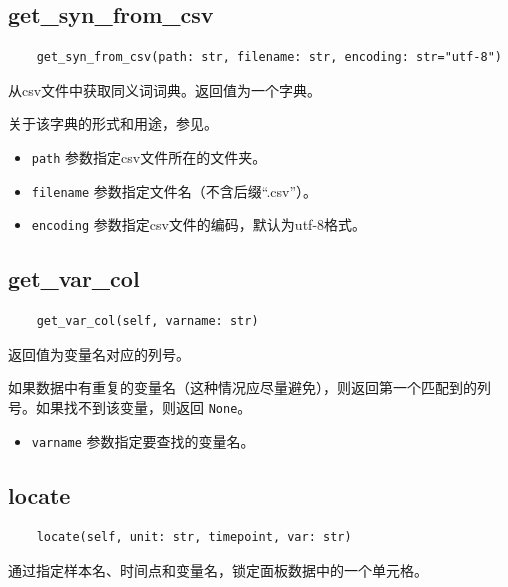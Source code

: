 \documentclass[a4paper, UTF8, fontset=none]{ctexart}
\begin{document}
\subsection{get\_syn\_from\_csv}

    \begin{lstlisting}
    get_syn_from_csv(path: str, filename: str, encoding: str="utf-8")
    \end{lstlisting}    

    从csv文件中获取同义词词典。返回值为一个字典。
    
    关于该字典的形式和用途，参见。

    \begin{itemize}
        \item \verb|path| 参数指定csv文件所在的文件夹。
        \item \verb|filename| 参数指定文件名（不含后缀“.csv”）。
        \item \verb|encoding| 参数指定csv文件的编码，默认为utf-8格式。
    \end{itemize}

\subsection{get\_var\_col}

    \begin{lstlisting}
    get_var_col(self, varname: str)
    \end{lstlisting}

    返回值为变量名对应的列号。
    
    如果数据中有重复的变量名（这种情况应尽量避免），则返回第一个匹配到的列号。如果找不到该变量，则返回 \verb|None|。

    \begin{itemize}
        \item \verb|varname| 参数指定要查找的变量名。
    \end{itemize}

\subsection{locate}

    \begin{lstlisting}
    locate(self, unit: str, timepoint, var: str)
    \end{lstlisting}    

    通过指定样本名、时间点和变量名，锁定面板数据中的一个单元格。
    
\end{document}
